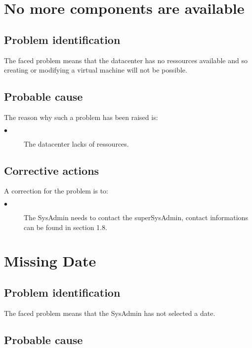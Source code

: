 \section{No more components are available} 

\subsection{Problem identification}
The faced problem means that the datacenter has no ressources available and so
creating or modifying a virtual machine will not be possible.

\subsection{Probable cause}

The reason why such a problem has been raised is:\\
\begin{description}
\item[$\bullet$] The datacenter lacks of ressources.
\end{description}


\subsection{Corrective actions}

A correction for the problem is to:\\
\begin{description}
\item[$\bullet$] The SysAdmin needs to contact the superSysAdmin, contact
informations can be found in section 1.8.

\end{description}





\section{Missing Date} 

\subsection{Problem identification}
The faced problem means that the SysAdmin has not selected a date.

\subsection{Probable cause}

